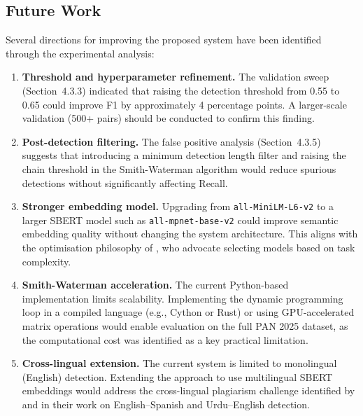\documentclass[12pt, a4paper]{article}
\begin{document}
\subsection{Future Work}

Several directions for improving the proposed system have been identified through the experimental analysis:

\begin{enumerate}
	\item \textbf{Threshold and hyperparameter refinement.} The validation sweep (Section~4.3.3) indicated that raising the detection threshold from 0.55 to 0.65 could improve F1 by approximately 4 percentage points. A larger-scale validation (500+ pairs) should be conducted to confirm this finding.

	\item \textbf{Post-detection filtering.} The false positive analysis (Section~4.3.5) suggests that introducing a minimum detection length filter and raising the chain threshold in the Smith-Waterman algorithm would reduce spurious detections without significantly affecting Recall.

	\item \textbf{Stronger embedding model.} Upgrading from \texttt{all-MiniLM-L6-v2} to a larger SBERT model such as \texttt{all-mpnet-base-v2} could improve semantic embedding quality without changing the system architecture. This aligns with the optimisation philosophy of \citet{LiuZhu2023}, who advocate selecting models based on task complexity.

	\item \textbf{Smith-Waterman acceleration.} The current Python-based implementation limits scalability. Implementing the dynamic programming loop in a compiled language (e.g., Cython or Rust) or using GPU-accelerated matrix operations would enable evaluation on the full PAN 2025 dataset, as the computational cost was identified as a key practical limitation.

	\item \textbf{Cross-lingual extension.} The current system is limited to monolingual (English) detection. Extending the approach to use multilingual SBERT embeddings would address the cross-lingual plagiarism challenge identified by \citet{Bouaine2023} and \citet{Zahid2023} in their work on English--Spanish and Urdu--English detection.
\end{enumerate}

\newpage


\end{document}
